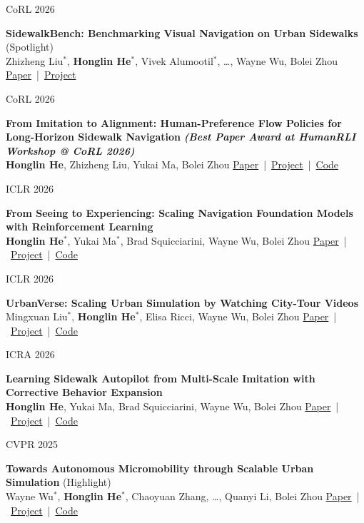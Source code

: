 \documentclass[letterpaper,10pt]{article}
\newlength{\gutter}\setlength{\gutter}{1.02in}
\newlength{\gutgap}\setlength{\gutgap}{0.14in}
\newlength{\bodycol}\setlength{\bodycol}{\textwidth-\gutter-\gutgap}
\newcommand{\entry}[2]{%
  \par\vspace{2pt}%
  \parbox[t]{\gutter}{\strut\small\color{keycol}\raggedright#1}%
  \hspace{\gutgap}%
  \parbox[t]{\bodycol}{\strut\raggedright#2}%
  \par}
\newcommand{\me}{\textbf{Honglin He}}
\newcommand{\pubtag}[1]{{\small\color{tagcol}(#1)}}
\newcommand{\links}[1]{\mbox{\small #1}}
\begin{document}
\entry{CoRL 2026}{%
  \textbf{SidewalkBench: Benchmarking Visual Navigation on Urban Sidewalks}
  \pubtag{Spotlight}\\
  Zhizheng Liu$^{*}$, \me$^{*}$, Vivek Alumootil$^{*}$, \ldots, Wayne Wu, Bolei Zhou
  \quad \links{\href{https://arxiv.org/abs/2606.16953}{Paper} | \href{https://vail-ucla.github.io/SidewalkBench/}{Project}}}

\entry{CoRL 2026}{%
  \textbf{From Imitation to Alignment: Human-Preference Flow Policies for Long-Horizon
  Sidewalk Navigation} \textbf{\textit{(Best Paper Award at HumanRLI Workshop @ CoRL 2026)}}\\
  \me, Zhizheng Liu, Yukai Ma, Bolei Zhou
  \quad \links{\href{https://vail-ucla.github.io/assets/projects/flowpilot/paper.pdf}{Paper} | \href{https://vail-ucla.github.io/FlowPilot/}{Project} | \href{https://github.com/VAIL-UCLA/FlowPilot}{Code}}}

\entry{ICLR 2026}{%
  \textbf{From Seeing to Experiencing: Scaling Navigation Foundation Models with
  Reinforcement Learning}\\
  \me$^{*}$, Yukai Ma$^{*}$, Brad Squicciarini, Wayne Wu, Bolei Zhou
  \quad \links{\href{https://arxiv.org/abs/2507.22028}{Paper} | \href{https://metadriverse.github.io/s2e}{Project} | \href{https://github.com/VAIL-UCLA/S2E}{Code}}}

\entry{ICLR 2026}{%
  \textbf{UrbanVerse: Scaling Urban Simulation by Watching City-Tour Videos}\\
  Mingxuan Liu$^{*}$, \me$^{*}$, Elisa Ricci, Wayne Wu, Bolei Zhou
  \quad \links{\href{https://arxiv.org/abs/2510.15018}{Paper} | \href{https://urbanverseproject.github.io/}{Project} | \href{https://github.com/VAIL-UCLA/UrbanVerse}{Code}}}

\entry{ICRA 2026}{%
  \textbf{Learning Sidewalk Autopilot from Multi-Scale Imitation with Corrective
  Behavior Expansion}\\
  \me, Yukai Ma, Brad Squicciarini, Wayne Wu, Bolei Zhou
  \quad \links{\href{https://vail-ucla.github.io/assets/projects/mimic/paper.pdf}{Paper} | \href{https://vail-ucla.github.io/MIMIC/}{Project} | \href{https://github.com/VAIL-UCLA/MIMIC}{Code}}}

\entry{CVPR 2025}{%
  \textbf{Towards Autonomous Micromobility through Scalable Urban Simulation}
  \pubtag{Highlight}\\
  Wayne Wu$^{*}$, \me$^{*}$, Chaoyuan Zhang, \ldots, Quanyi Li, Bolei Zhou
  \quad \links{\href{https://arxiv.org/abs/2505.00690}{Paper} | \href{https://metadriverse.github.io/urbansim/}{Project} | \href{https://github.com/metadriverse/urban-sim}{Code}}}
\end{document}
